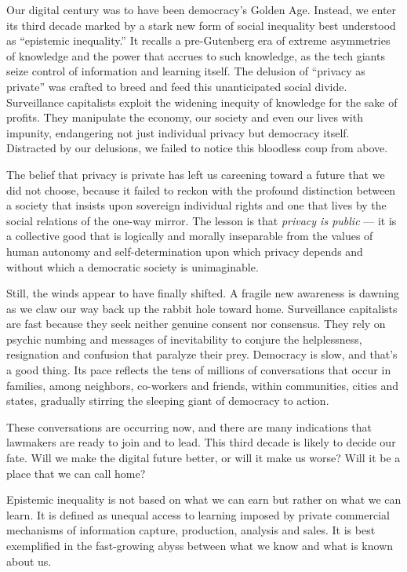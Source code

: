 Our digital century was to have been democracy's Golden Age. Instead, we
enter its third decade marked by a stark new form of social inequality
best understood as ``epistemic inequality.'' It recalls a pre-Gutenberg
era of extreme asymmetries of knowledge and the power that accrues to
such knowledge, as the tech giants seize control of information and
learning itself. The delusion of ``privacy as private'' was crafted to
breed and feed this unanticipated social divide. Surveillance
capitalists exploit the widening inequity of knowledge for the sake of
profits. They manipulate the economy, our society and even our lives
with impunity, endangering not just individual privacy but democracy
itself. Distracted by our delusions, we failed to notice this bloodless
coup from above.

The belief that privacy is private has left us careening toward a future
that we did not choose, because it failed to reckon with the profound
distinction between a society that insists upon sovereign individual
rights and one that lives by the social relations of the one-way mirror.
The lesson is that \emph{privacy is public} --- it is a collective good
that is logically and morally inseparable from the values of human
autonomy and self-determination upon which privacy depends and without
which a democratic society is unimaginable.

Still, the winds appear to have finally shifted. A fragile new awareness
is dawning as we claw our way back up the rabbit hole toward home.
Surveillance capitalists are fast because they seek neither genuine
consent nor consensus. They rely on psychic numbing and messages of
inevitability to conjure the helplessness, resignation and confusion
that paralyze their prey. Democracy is slow, and that's a good thing.
Its pace reflects the tens of millions of conversations that occur in
families, among neighbors, co-workers and friends, within communities,
cities and states, gradually stirring the sleeping giant of democracy to
action.

These conversations are occurring now, and there are many indications
that lawmakers are ready to join and to lead. This third decade is
likely to decide our fate. Will we make the digital future better, or
will it make us worse? Will it be a place that we can call home?

Epistemic inequality is not based on what we can earn but rather on what
we can learn. It is defined as unequal access to learning imposed by
private commercial mechanisms of information capture, production,
analysis and sales. It is best exemplified in the fast-growing abyss
between what we know and what is known about us.

